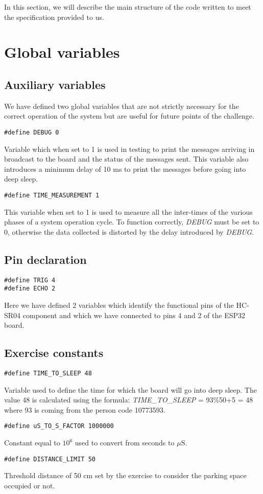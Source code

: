 In this section, we will describe the main structure of the code written to meet the specification provided to us.
\section{Global variables}
\subsection{Auxiliary variables}
We have defined two global variables that are not strictly necessary for the correct operation of the system but are useful for future points of the challenge.
\begin{verbatim}
#define DEBUG 0
\end{verbatim}
Variable which when set to 1 is used in testing to print the messages arriving in broadcast to the board and the status of the messages sent. This variable also introduces a minimum delay of 10 ms to print the messages before going into deep sleep.\\
\begin{verbatim}
#define TIME_MEASUREMENT 1
\end{verbatim}
This variable when set to 1 is used to measure all the inter-times of the various phases of a system operation cycle. To function correctly,  \textit{DEBUG} must be set to 0, otherwise the data collected is distorted by the delay introduced by  \textit{DEBUG}.


\subsection{Pin declaration}
\begin{verbatim}
#define TRIG 4
#define ECHO 2
\end{verbatim}
Here we have defined 2 variables which identify the functional pins of the HC-SR04 component and which we have connected to pins 4 and 2 of the ESP32 board.

\subsection{Exercise constants}
\begin{verbatim}
#define TIME_TO_SLEEP 48
\end{verbatim}
Variable used to define the time for which the board will go into deep sleep. The value 48 is calculated using the formula:  \textit{TIME\_TO\_SLEEP} = 93\%50+5 = 48 \\
where 93 is coming from the person code 10773593. \\
\begin{verbatim}
#define uS_TO_S_FACTOR 1000000
\end{verbatim}
Constant equal to $10^6$ used to convert from seconds to $\mu\text{S}$.\\
\begin{verbatim}
#define DISTANCE_LIMIT 50
\end{verbatim}
Threshold distance of 50 cm set by the exercise to consider the parking space occupied or not.



